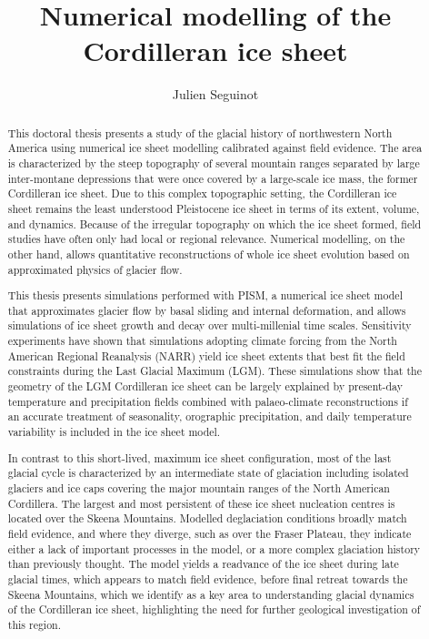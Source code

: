\documentclass{article}
\title{Numerical modelling of the Cordilleran ice sheet}
\author{Julien Seguinot}
\begin{document}

\maketitle

\begin{abstract}

This doctoral thesis presents a study of the glacial history of northwestern
North America using numerical ice sheet modelling calibrated against field
evidence. The area is characterized by the steep topography of several mountain
ranges separated by large inter-montane depressions that were once covered by a
large-scale ice mass, the former Cordilleran ice sheet. Due to this complex
topographic setting, the Cordilleran ice sheet remains the least understood
Pleistocene ice sheet in terms of its extent, volume, and dynamics. Because of
the irregular topography on which the ice sheet formed, field studies have
often only had local or regional relevance. Numerical modelling, on the other
hand, allows quantitative reconstructions of whole ice sheet evolution based on
approximated physics of glacier flow.

This thesis presents simulations performed with PISM, a numerical ice sheet
model that approximates glacier flow by basal sliding and internal deformation,
and allows simulations of ice sheet growth and decay over multi-millenial time
scales. Sensitivity experiments have shown that simulations adopting climate
forcing from the North American Regional Reanalysis (NARR) yield ice sheet
extents that best fit the field constraints during the Last Glacial Maximum
(LGM). These simulations show that the geometry of the LGM Cordilleran ice
sheet can be largely explained by present-day temperature and precipitation
fields combined with palaeo-climate reconstructions if an accurate treatment of
seasonality, orographic precipitation, and daily temperature variability is
included in the ice sheet model.

In contrast to this short-lived, maximum ice sheet configuration, most of the
last glacial cycle is characterized by an intermediate state of glaciation
including isolated glaciers and ice caps covering the major mountain ranges of
the North American Cordillera. The largest and most persistent of these ice
sheet nucleation centres is located over the Skeena Mountains. Modelled
deglaciation conditions broadly match field evidence, and where they diverge,
such as over the Fraser Plateau, they indicate either a lack of important
processes in the model, or a more complex glaciation history than previously
thought. The model yields a readvance of the ice sheet during late glacial
times, which appears to match field evidence, before final retreat towards the
Skeena Mountains, which we identify as a key area to understanding glacial
dynamics of the Cordilleran ice sheet, highlighting the need for further
geological investigation of this region.


\end{abstract}
\end{document}
